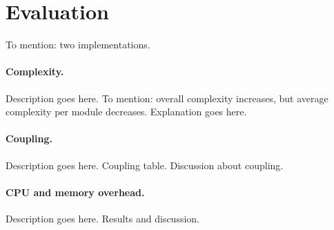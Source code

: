 \section{Evaluation}\label{sec:eval}
To mention: two implementations.

\paragraph{Complexity.} Description goes here. To mention: overall complexity increases, but average complexity per module decreases. Explanation goes here.

\paragraph{Coupling.} Description goes here. Coupling table. Discussion about coupling.

\paragraph{CPU and memory overhead.} Description goes here. Results and discussion.